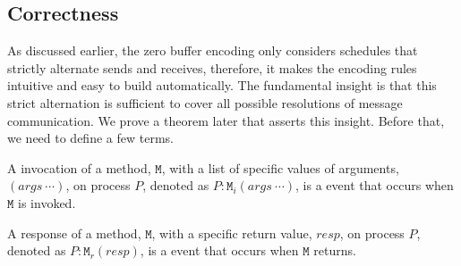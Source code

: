 

\subsection{Correctness}
As discussed earlier, the zero buffer encoding only considers schedules that strictly alternate sends and receives, therefore, it makes the encoding rules intuitive and easy to build automatically. The fundamental insight is that this strict alternation is sufficient to cover all possible resolutions of message communication. We prove a theorem later that asserts this insight. Before that, we need to define a few terms.




\begin{definition}\label{def:invocation}
A invocation of a method, $\mathtt{M}$, with a list of specific values of arguments, $(args\ \cdots)$, on process $P$, denoted as $P:\mathtt{M}_i(args\ \cdots)$, is a event that occurs when $\mathtt{M}$ is invoked.
\end{definition}

\begin{definition}\label{def:response}
A response of a method, $\mathtt{M}$, with a specific return value, $resp$, on process $P$, denoted as $P:\mathtt{M}_r(resp)$, is a event that occurs when $\mathtt{M}$ returns.
\end{definition}

